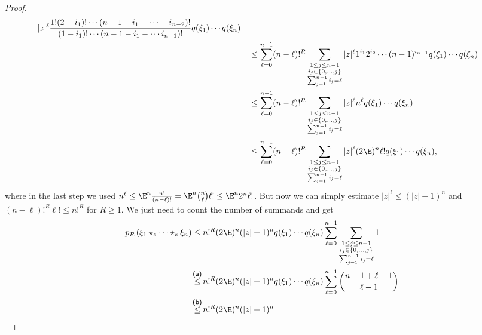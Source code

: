 \begin{proof}
\begin{align*}
{{		}}
        |z|^{\ell}
        \frac{1!  (2 - i_1)! \cdots (n-1 - i_1 - \cdots - i_{n-2})!}
        {(1 - i_1)! \cdots (n-1 - i_1 - \cdots i_{n-1})!}
        q(\xi_1) \cdots q(\xi_n)
        \\
        &\quad\leq
        \sum\limits_{\ell = 0}^{n-1}
        (n - \ell)!^R
        \sum\limits_{\substack{
			1 \leq j \leq n-1 \\
			i_j \in \{0, \ldots, j\} \\
			\sum_{j = 1}^{n - 1} i_j = \ell
		}}
        |z|^{\ell}
        1^{i_1} 2^{i_2}
        \cdots (n-1)^{i_{n-1}}
        q(\xi_1) \cdots q(\xi_n)
        \\
        &\quad\leq
        \sum\limits_{\ell = 0}^{n-1}
        (n - \ell)!^R
        \sum\limits_{\substack{
			1 \leq j \leq n-1 \\
			i_j \in \{0, \ldots, j\} \\
			\sum_{j = 1}^{n - 1} i_j = \ell
		}}
        |z|^{\ell}
        n^{\ell}
        q(\xi_1) \cdots q(\xi_n)
        \\
        &\quad\leq
        \sum\limits_{\ell = 0}^{n-1}
        (n - \ell)!^R
        \sum\limits_{\substack{
			1 \leq j \leq n-1 \\
			i_j \in \{0, \ldots, j\} \\
			\sum_{j = 1}^{n - 1} i_j = \ell
		}}
        |z|^{\ell} (2 \E)^n \ell!
        q(\xi_1) \cdots q(\xi_n),
    \end{align*}
    where in the last step we used $n^{\ell} \leq \E^n
    \frac{n!}{(n-\ell)!} = \E^n \binom{n} {\ell} \ell! \leq \E^n 2^n
    \ell!$. But now we can simply estimate $|z|^{\ell} \leq (|z| +
    1)^n$ and $(n - \ell)!^R \ell! \leq n!^R$ for $R \geq 1$. We just
    need to count the number of summands and get
    \begin{align*}
        p_R \left(
            \xi_1 \star_z \cdots \star_z \xi_n
        \right)
        & \leq
        n!^R (2 \E)^n (|z| + 1)^n
        q(\xi_1) \cdots q(\xi_n)
        \sum\limits_{\ell = 0}^{n-1}
        \sum\limits_{\substack{
			1 \leq j \leq n-1 \\
			i_j \in \{0, \ldots, j\} \\
			\sum_{j = 1}^{n - 1} i_j = \ell
		}}
		1
        \\
        &\ot{(a)}{\leq}
        n!^R (2 \E)^n (|z| + 1)^n
        q(\xi_1) \cdots q(\xi_n)
        \sum\limits_{\ell = 0}^{n-1}
        \binom{n - 1 + \ell - 1}{\ell - 1}
        \\
        &\ot{(b)}{\leq}
        n!^R (2 \E)^n (|z| + 1)^n

\end{align*}
\end{proof}
